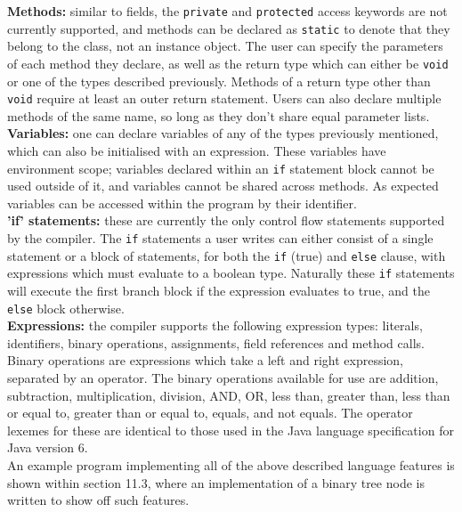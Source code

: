\documentclass[a4paper, 11pt]{article}
\begin{document}
\textbf{Methods:} similar to fields, the \texttt{private} and \texttt{protected} access keywords are not currently supported, and methods can be declared as \texttt{static} to denote that they belong to the class, not an instance object. The user can specify the parameters of each method they declare, as well as the return type which can either be \texttt{void} or one of the types described previously. Methods of a return type other than \texttt{void} require at least an outer return statement. Users can also declare multiple methods of the same name, so long as they don't share equal parameter lists.
\\\newline
\textbf{Variables:} one can declare variables of any of the types previously mentioned, which can also be initialised with an expression. These variables have environment scope; variables declared within an \texttt{if} statement block cannot be used outside of it, and variables cannot be shared across methods. As expected variables can be accessed within the program by their identifier. 
\\\newline
\textbf{'if' statements:} these are currently the only control flow statements supported by the compiler. The \texttt{if} statements a user writes can either consist of a single statement or a block of statements, for both the \texttt{if} (true) and \texttt{else} clause, with expressions which must evaluate to a boolean type. Naturally these \texttt{if} statements will execute the first branch block if the expression evaluates to true, and the \texttt{else} block otherwise.
\\\newline
\textbf{Expressions:} the compiler supports the following expression types: literals, identifiers, binary operations, assignments, field references and method calls. Binary operations are expressions which take a left and right expression, separated by an operator. The binary operations available for use are addition, subtraction, multiplication, division, AND, OR, less than, greater than, less than or equal to, greater than or equal to, equals, and not equals. The operator lexemes for these are identical to those used in the Java language specification for Java version 6. 
\\\newline
An example program implementing all of the above described language features is shown within section 11.3, where an implementation of a binary tree node is written to show off such features.
\end{document}
